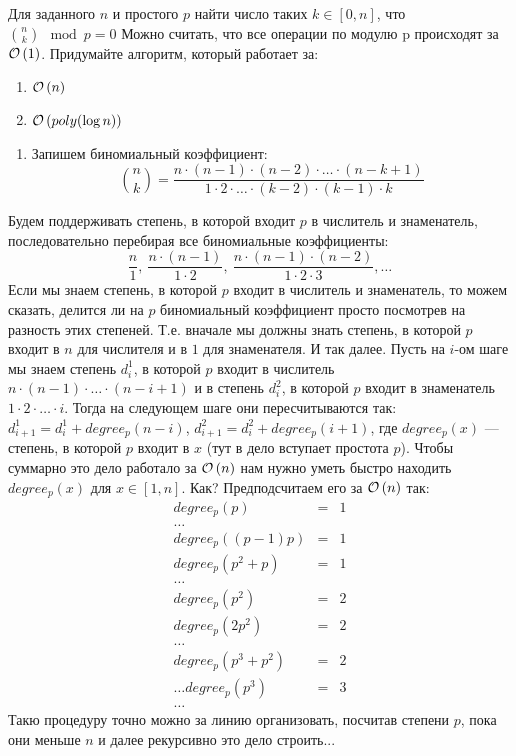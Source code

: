 \begin{task}[2]
Для заданного $n$ и простого $p$ найти число таких $k \in [0, n]$, что ${n \choose k} \mod{p} = 0$
Можно считать, что все операции по модулю p происходят за $\mathcal{O}\left(1\right)$. Придумайте алгоритм, который работает за:
	\begin{enumerate}[label=(\alph*)]
		\item $\mathcal{O}\left(n\right)$
		\item $\mathcal{O}\left(poly{(\log{n})}\right)$
	\end{enumerate}
\end{task}
\begin{solution}

\begin{enumerate}[label=(\alph*)]
	\item Запишем биномиальный коэффициент: 
	\[ 
		{n \choose k} = \frac{n\cdot(n-1)\cdot(n-2)\cdot \ldots \cdot (n-k+1)}{1\cdot2\cdot\ldots\cdot(k-2)\cdot(k-1)\cdot k}
	\]
\end{enumerate}
Будем поддерживать степень, в которой входит $p$ в числитель и знаменатель, последовательно перебирая все биномиальные коэффициенты:
\[
	\frac{n}{1},\ \frac{n\cdot(n-1)}{1\cdot2},\ \frac{n\cdot(n-1)\cdot(n-2)}{1\cdot2\cdot3}, \ldots
\]
Если мы знаем степень, в которой $p$ входит в числитель и знаменатель, то можем сказать, делится ли на $p$ биномиальный коэффициент просто посмотрев на разность этих степеней.
Т.е. вначале мы должны знать степень, в которой $p$ входит в $n$ для числителя и в $1$ для знаменателя. И так далее. Пусть на $i$-ом шаге мы знаем степень $d^1_i$, в которой $p$ входит в числитель $n\cdot(n-1)\cdot\ldots\cdot(n-i+1)$ и в степень $d^2_i$, в которой $p$ входит в знаменатель $1\cdot2\cdot\ldots \cdot i$. Тогда на следующем шаге они пересчитываются так: $d^1_{i+1} = d^1_i + degree_p(n - i)$, $d^2_{i+1} = d^2_i + degree_p(i + 1)$, где $degree_p(x)$ --- степень, в которой $p$ входит в $x$ (тут в дело вступает простота $p$). Чтобы суммарно это дело работало за $\mathcal{O}\left(n\right)$ нам нужно уметь быстро находить $degree_p(x)$ для $x \in [1, n]$. Как? Предподсчитаем его за $\mathcal{O}\left(n\right)$ так:
\[
	\begin{array}{lcl}
		degree_p(p)  & = & 1\\
		\ldots\\
		degree_p((p-1)p) & = & 1\\
		degree_p(p^2 + p) & = & 1 \\
		\ldots\\
		degree_p(p^2) & = & 2 \\
		degree_p(2p^2) & = & 2 \\
		\ldots\\
		degree_p(p^3 + p^2) & = & 2\\
		\ldots
		degree_p(p^3) & = & 3\\
		\ldots
	\end{array}
\] 
Такю процедуру точно можно за линию организовать, посчитав степени $p$, пока они меньше $n$ и далее рекурсивно это дело строить...
\xqed
\end{solution}





